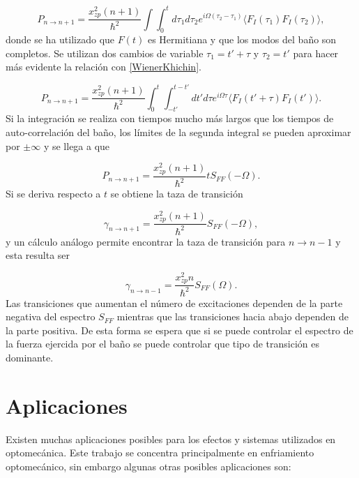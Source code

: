 \documentclass[10pt,a4paper]{report}
\begin{document}
\begin{equation}
P_{n \to n+1} = \frac{x_{zp}^2 (n+1)}{\hbar^2} \int\int_0^t d\tau_1 d\tau_2 e^{i \Omega (\tau_2-\tau_1)}\langle F_I(\tau_1)F_I(\tau_2) \rangle ,
\end{equation} donde se ha utilizado que $F(t)$ es Hermitiana y que los modos del baño son completos. Se utilizan dos cambios de variable $\tau_1 = t' + \tau$ y $\tau_2 = t'$ para hacer más evidente la relación con \eqref{WienerKhichin}.

\begin{equation}
P_{n \to n+1} = \frac{x_{zp}^2 (n+1)}{\hbar^2} \int_0^t \int_{-t'}^{t-t'} dt' d\tau e^{i \Omega \tau}\langle F_I(t'+\tau)F_I(t') \rangle.
\end{equation} Si la integración se realiza con tiempos mucho más largos que los tiempos de auto-correlación del baño, los límites de la segunda integral se pueden aproximar por $\pm \infty$ y se llega a que

\begin{equation}
P_{n \to n+1} = \frac{x_{zp}^2 (n+1)}{\hbar^2} t S_{FF}(-\Omega).
\end{equation} Si se deriva respecto a $t$ se obtiene la taza de transición

\begin{equation}
\gamma_{n \to n+1} = \frac{x_{zp}^2 (n+1)}{\hbar^2}  S_{FF}(-\Omega),
\end{equation} y un cálculo análogo permite encontrar la taza de transición para $n \to n-1$ y esta resulta ser

\begin{equation}
\gamma_{n \to n-1} = \frac{x_{zp}^2 n}{\hbar^2} S_{FF}(\Omega).
\end{equation} Las transiciones que aumentan el número de excitaciones dependen de la parte negativa del espectro $S_{FF}$ mientras que las transiciones hacia abajo dependen de la parte positiva. De esta forma se espera que si se puede controlar el espectro de la fuerza ejercida por el baño se puede controlar que tipo de transición es dominante.
 


\section{Aplicaciones}

Existen muchas aplicaciones posibles para los efectos y sistemas utilizados en optomecánica. Este trabajo se concentra principalmente en enfriamiento optomecánico, sin embargo algunas otras posibles aplicaciones son:
\end{document}
